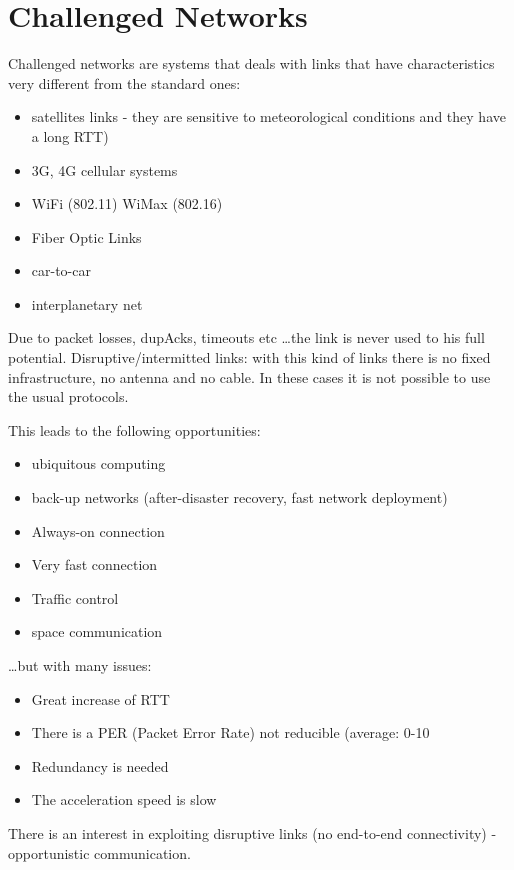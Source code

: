 \section{Challenged Networks}

Challenged networks are systems that deals with links that have
characteristics very different from the standard ones:

\begin{itemize}
  \item satellites links - they are sensitive to meteorological conditions
and they have a long RTT)
  \item 3G, 4G cellular systems
  \item WiFi (802.11) WiMax (802.16)
  \item Fiber Optic Links
  \item car-to-car
  \item interplanetary net
\end{itemize}

Due to packet losses, dupAcks, timeouts etc \dots the link is never used
to his full potential.
Disruptive/intermitted links: with this kind of links there is no fixed
infrastructure, no antenna and no cable.
In these cases it is not possible to use the usual protocols.

This leads to the following opportunities:
\begin{itemize}
  \item ubiquitous computing
  \item back-up networks (after-disaster recovery, fast network deployment)
  \item Always-on connection
  \item Very fast connection
  \item Traffic control
  \item space communication
\end{itemize}

\dots but with many issues:

\begin{itemize}
  \item Great increase of RTT
  \item There is a PER (Packet Error Rate) not reducible (average: 0-10%
  \item Redundancy is needed
  \item The acceleration speed is slow
\end{itemize}

There is an interest in exploiting disruptive links (no end-to-end
connectivity) - opportunistic communication.

